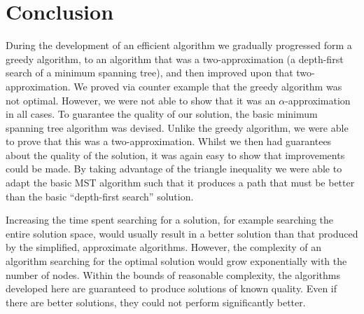\documentclass[11pt]{article}
\begin{document}
\section{Conclusion}

During the development of an efficient algorithm we gradually progressed form a greedy algorithm, to an algorithm that was a two-approximation (a depth-first search of a minimum spanning tree), and then improved upon that two-approximation. We proved via counter example that the greedy algorithm was not optimal. However, we were not able to show that it was an $\alpha$-approximation in all cases. To guarantee the quality of our solution, the basic minimum spanning tree algorithm was devised. Unlike the greedy algorithm, we were able to prove that this was a two-approximation. Whilst we then had guarantees about the quality of the solution, it was again easy to show that improvements could be made. By taking advantage of the triangle inequality we were able to adapt the basic MST algorithm such that it produces a path that must be better than the basic ``depth-first search'' solution.

Increasing the time spent searching for a solution, for example searching the entire solution space, would usually result in a better solution than that produced by the simplified, approximate algorithms. However, the complexity of an algorithm searching for the optimal solution would grow exponentially with the number of nodes. Within the bounds of reasonable complexity, the algorithms developed here are guaranteed to produce solutions of known quality. Even if there are better solutions, they could not perform significantly better.
\end{document}
